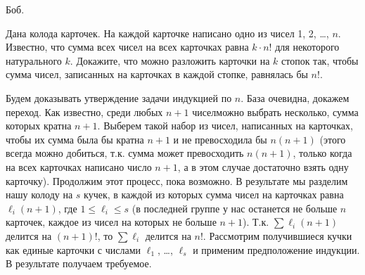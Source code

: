 \begin{problems}
 Боб.

\item Дана колода карточек. На каждой карточке написано одно из чисел 1, 2, \ldots, $n$. Известно, что сумма всех чисел на всех карточках равна $k\cdot n!$ для некоторого натурального $k$. Докажите, что можно разложить карточки на $k$ стопок так, чтобы сумма чисел, записанных на карточках в каждой стопке, равнялась бы $n!$.

 Будем доказывать утверждение задачи индукцией по $n$. База очевидна, докажем переход. Как известно, среди любых $n+1$ чиселможно выбрать несколько, сумма которых кратна $n+1$. Выберем такой набор из чисел, написанных на карточках, чтобы их сумма была бы кратна $n+1$ и не превосходила бы $n(n+1)$ (этого всегда можно добиться, т.к. сумма может превосходить $n(n+1)$, только когда на всех карточках написано число $n+1$, а в этом случае достаточно взять одну карточку). Продолжим этот процесс, пока возможно. В результате мы разделим нашу колоду на $s$ кучек, в каждой из которых сумма чисел на карточках равна $\ell_i(n+1)$, где $1\leq\ell_i\leq s$ (в последней группе у нас останется не больше $n$ карточек, каждое из чисел на которых не больше $n+1$). Т.к. $\sum\ell_i (n+1)$ делится на $(n+1)$!, то $\sum\ell_i$ делится на $n!$. Рассмотрим получившиеся кучки как единые карточки с числами $\ell_1$, \ldots, $\ell_s$ и применим предположение индукции. В результате получаем требуемое.

\end{problems}

